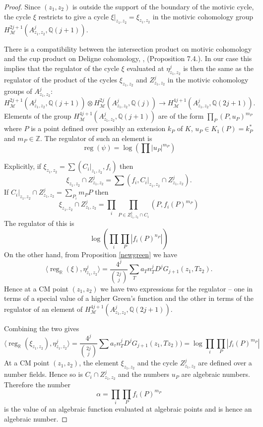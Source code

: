 \documentclass[11pt,a4paper]{article}
\newcommand {\ZZ}{{\mathds Z}}
\newcommand {\Q}{{\mathds Q}}
\newcommand {\R}{{\mathds R}}
\newcommand {\M}{{\mathcal M}}
\def\reg{\operatorname{reg}}
\begin{document}
\begin{proof}
	
	
	
	 Since $(z_1,z_2)$ is  outside the support of the boundary of the motivic cycle, the cycle $\xi$ restricts to give a cycle $\xi|_{z_1,z_2}=\xi_{z_1,z_2}$ in the motivic cohomology group $H^{2j+1}_{\M}(A^j_{z_1,z_2},\Q(j+1))$. 
	
	There is a compatibility between the intersection product on motivic cohomology  and the cup product on Deligne cohomology, \cite{esvi}, (Proposition 7.4.). In our case this implies that  the regulator of the cycle $\xi$ evaluated at $\eta^j_{z_1,z_2}$ is then the same  as the regulator of the product of the cycles $\xi_{z_1,z_2}$ and $Z^j_{z_1,z_2}$ in the motivic cohomology groups of $A^j_{z_1,z_2}$: 
	$$H^{2j+1}_{\M}(A^j_{z_1,z_2},\Q(j+1)) \otimes H^{2j}_{\M}(A^j_{z_1,z_2},\Q(j)) \longrightarrow H^{4j+1}_{\M}(A^j_{z_1,z_2},\Q(2j+1)).$$
	Elements of the group $H^{4j+1}_{\M}(A^j_{z_1,z_2},\Q(j+1))$ are of the form $\prod_P (P,u_P)^{m_P}$ where $P$ is a point defined over possibly an extension $k_P$ of $K$, $u_P \in K_1(P)=k_P^*$ and $m_P \in \ZZ$. The regulator of such an element is
	$$\reg(\psi)=\log \left( \prod |u_P|^{m_P}\right)$$
	
	
	Explicitly, if $\xi_{z_1,z_2}=\sum (C_i|_{z_1,z_2},f_i)$ then
	$$\xi_{z_1,z_2} \cap Z^j_{z_1,z_2}=\sum (f_i, C_i|_{z_1,z_2} \cap Z^j_{z_1,z_2}).$$
	If $C_i|_{z_1,z_2} \cap Z^j_{z_1,z_2}=\sum_{P_i}  m_{P} P$ then 
	$$ \xi_{z_1,z_2} \cap Z^j_{z_1,z_2}=\prod_i \prod_{P \in Z^j_{z_1,z_2} \cap C_i}  (P,f_i(P)^{m_P})$$
	The regulator of this is 
	$$\log \left( \prod_i \prod_P   \left|f_i(P)^{n_P} \right|\right)$$
	On the other hand, from  Proposition \ref{newgreen} we have 
	$$\langle \reg_{\R}(\xi),\eta^j_{z_1,z_2} \rangle = \frac{4^j}{\binom{2j}{j}}\sum_T a_{T} n_T^j D^j G_{j+1}(z_1,Tz_2).$$
	Hence at a CM point $(z_1,z_2)$ we have two expressions for the regulator -- one in terms of a special value  of a higher Green's function and the other in terms of the regulator of an element of  $H^{4j+1}_{\M}(A^j_{z_1,z_2},\Q(2j+1))$.	
	
	Combining the two gives 
	$$\langle \reg_{\R} (\xi_{z_1,z_2}),\eta^j_{z_1,z_2} \rangle=\frac{4^j}{\binom{2j}{j}} \sum a_{\tau} n_T^j D^j G_{j+1}(z_1,Tz_2))=  \log  \prod_i \prod_P \left| f_i(P)^{m_P}\right|$$
	At a CM point $(z_1,z_2)$, the element $\xi_{z_1,z_2}$  and the cycle $Z^j_{z_1,z_2}$ are defined over a number fields. Hence so is $C_i \cap Z^j_{z_1,z_2}$ and the numbers $u_P$ are algebraic numbers.  Therefore  the number 
	$$ \alpha = \prod_i \prod_P  f_i(P)^{m_P}$$
	is the value of an algebraic function evaluated at algebraic points and is hence an algebraic number.  
	
	
	
\end{proof}
\end{document}
